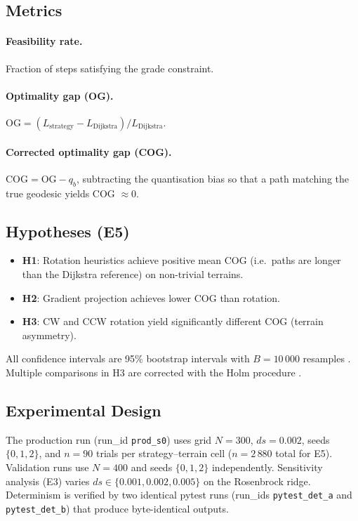 \documentclass[11pt,a4paper]{article}
\begin{document}
\subsection{Metrics}
\paragraph{Feasibility rate.}
Fraction of steps satisfying the grade constraint.

\paragraph{Optimality gap (OG).}
$\text{OG} = (L_{\text{strategy}} - L_{\text{Dijkstra}}) / L_{\text{Dijkstra}}$.

\paragraph{Corrected optimality gap (COG).}
$\text{COG} = \text{OG} - q_b$, subtracting the quantisation bias so that a
path matching the true geodesic yields COG $\approx 0$.

\subsection{Hypotheses (E5)}
\begin{itemize}
  \item \textbf{H1}: Rotation heuristics achieve positive mean COG (i.e.\ paths
        are longer than the Dijkstra reference) on non-trivial terrains.
  \item \textbf{H2}: Gradient projection achieves lower COG than rotation.
  \item \textbf{H3}: CW and CCW rotation yield significantly different COG
        (terrain asymmetry).
\end{itemize}
All confidence intervals are 95\% bootstrap intervals with $B=10\,000$
resamples \citep{Efron1979}.
Multiple comparisons in H3 are corrected with the Holm procedure \citep{Holm1979}.

\subsection{Experimental Design}
The production run (run\_id \texttt{prod\_s0}) uses grid $N=300$, $ds=0.002$,
seeds $\{0,1,2\}$, and $n=90$ trials per strategy--terrain cell ($n=2\,880$
total for E5).
Validation runs use $N=400$ and seeds $\{0,1,2\}$ independently.
Sensitivity analysis (E3) varies $ds \in \{0.001, 0.002, 0.005\}$ on the
Rosenbrock ridge.
Determinism is verified by two identical pytest runs (run\_ids
\texttt{pytest\_det\_a} and \texttt{pytest\_det\_b}) that produce byte-identical
outputs.
\end{document}
